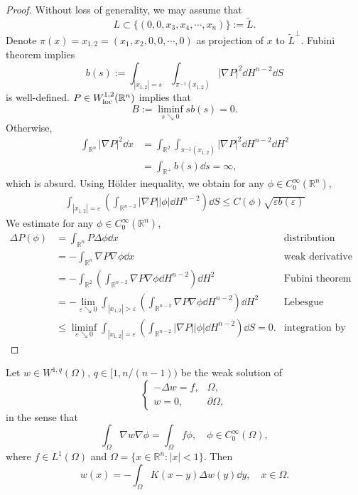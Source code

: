 \begin{proof}
  Without loss of generality, we may assume that 
  \[
  L\subset\{(0,0,x_3,x_4,\cdots,x_n)\} := \tilde L.
  \]
  Denote $\pi(x) = x_{1,2} = (x_1, x_2, 0,0,\cdots,0)$ as projection of $x$ to $\tilde L^\bot $.
  Fubini theorem implies 
  \[
  b(s) := \int_{|x_{1,2}|=s}\int_{\pi^{-1}(x_{1,2})}|\nabla P|^2\dd H^{n-2}\dd S
  \]
  is well-defined.
  $P\in W^{1,2}_{\operatorname*{loc}}(\mathbb R^n)$ implies that 
  \[
  B := \liminf_{s\searrow0}sb(s) = 0.
  \]
  Otherwise,
  \begin{align*}
    \int_{\mathbb R^n}|\nabla P|^2\dd x 
    &= \int_{\mathbb R^2}\int_{\pi^{-1}(x_{1,2})}|\nabla P|^2\dd H^{n-2}\dd H^2\\
    &= \int_{\mathbb R^+}b(s)\dd s = \infty,
  \end{align*}
  which is absurd.
  Using H\"older inequality, we obtain for any $\phi\in C_0^{\infty}(\mathbb R^n)$,
  \begin{align*}
    \int_{|x_{1,2}|=\varepsilon}
    \left(\int_{\mathbb R^{n-2}}|\nabla P||\phi|\dd H^{n-2}\right)\dd S
    \leq C(\phi)\sqrt{\varepsilon b(\varepsilon)}
  \end{align*}
  We estimate for any $\phi\in C_0^{\infty}(\mathbb R^n)$,
  \begin{align*}
    \Delta P(\phi) 
    &= \int_{\mathbb R^n}P\Delta\phi\dd x &\text{distribution derivative}\\
    &= -\int_{\mathbb R^n}\nabla P\nabla \phi\dd x &\text{weak derivative}\\
    &= -\int_{\mathbb R^{2}}\left(\int_{\mathbb R^{n-2}}\nabla P\nabla \phi\dd H^{n-2} \right)\dd H^2
    &\text{Fubini theorem}\\
    &= -\lim_{\varepsilon\searrow0}
    \int_{|x_{1,2}| > \varepsilon} \left(\int_{\mathbb R^{n-2}}\nabla P\nabla \phi\dd H^{n-2}\right)\dd H^2
    &\text{Lebesgue dominated convergence theorem}\\
    &\leq \liminf_{\varepsilon\searrow0}\int_{|x_{1,2}|=\varepsilon}
    \left(\int_{\mathbb R^{n-2}}|\nabla P||\phi|\dd H^{n-2}\right)\dd S = 0.
    &\text{integration by parts}
  \end{align*}
\end{proof}

\begin{lemma}
  Let $w\in W^{1,q}(\Omega)$, $q\in[1,n/(n-1))$ be the weak solution of 
  \begin{equation*}
    \begin{cases}
      -\Delta w = f, & \Omega,\\
      w = 0, &\partial\Omega,
    \end{cases}
  \end{equation*}
  in the sense that 
  \[
  \int_\Omega \nabla w\nabla \phi = \int_\Omega f\phi, \quad\phi\in C_0^\infty(\Omega),
  \]
  where $f\in L^1(\Omega)$ and $\Omega = \{x\in \mathbb R^n: |x| < 1\}$.
  Then 
  \[
  w(x) = -\int_{\Omega}K(x-y)\Delta w(y)\dd y, \quad x\in\Omega.
  \]
\end{lemma}

